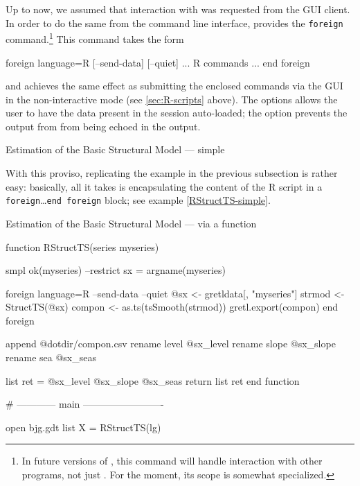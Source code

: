 Up to now, we assumed that interaction with  was requested from
the GUI client. In order to do the same from the command
line interface,  provides the \texttt{foreign}
command.\footnote{In future versions of , this command will
  handle interaction with other programs, not just . For the
  moment, its scope is somewhat specialized.} This command takes the form
\begin{code}
foreign language=R [--send-data] [--quiet]
    ... R commands ...
end foreign
\end{code}
and achieves the same effect as submitting the enclosed 
commands via the GUI in the non-interactive mode (see
\ref{sec:R-scripts} above). The  options allows the
user to have the data present in the  session auto-loaded;
the  option prevents the output from  from being
echoed in the  output.

\begin{script}[htbp]
  \caption{Estimation of the Basic Structural Model --- simple}
\label{RStructTS-simple}
\end{script}

With this proviso, replicating the example in the previous subsection
is rather easy: basically, all it takes is encapsulating the content
of the R script in a \texttt{foreign}\ldots\texttt{end foreign}
block; see example \ref{RStructTS-simple}.

\begin{script}[htbp]
  \caption{Estimation of the Basic Structural Model --- via a function}
\begin{scode}
function RStructTS(series myseries)

    smpl ok(myseries) --restrict
    sx = argname(myseries)

    foreign language=R --send-data --quiet
        @sx <- gretldata[, "myseries"]
        strmod <- StructTS(@sx)
        compon <- as.ts(tsSmooth(strmod))
        gretl.export(compon)
    end foreign

    append @dotdir/compon.csv
    rename level @sx_level
    rename slope @sx_slope
    rename sea @sx_seas

    list ret = @sx_level @sx_slope @sx_seas
    return list ret
end function

# ------------ main -------------------------

open bjg.gdt
list X = RStructTS(lg)
\end{scode}

\label{RStructTS-func}
\end{script}


